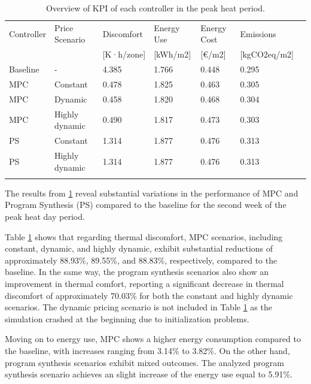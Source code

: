 \begin{table}
    \caption{Overview of KPI of each controller in the peak heat period.}
    \label{tab:2}
    
    \centering
    \begin{tabular}{lllllll}
        \hline
        \noalign{\smallskip}
        Controller & Price Scenario & Discomfort & Energy Use & Energy Cost & Emissions  \\
        & & [K·h/zone] & [kWh/m2] & [€/m2] & [kgCO2eq/m2] \\
        \noalign{\smallskip}
        \hline
        \noalign{\smallskip}
        Baseline & - & 4.385 & 1.766 & 0.448 & 0.295 \\
        MPC & Constant & 0.478 & 1.825 & 0.463 & 0.305 \\
        MPC & Dynamic & 0.458 & 1.820 & 0.468 & 0.304 \\
        MPC & Highly dynamic & 0.490 & 1.817 & 0.473 & 0.303 \\
        PS & Constant & 1.314 & 1.877 & 0.476 & 0.313 \\
        PS & Highly dynamic & 1.314 & 1.877 & 0.476 & 0.313 \\
        \noalign{\smallskip}
        \hline
    \end{tabular}
\end{table}

 The results from \ref{tab:2} reveal substantial variations in the performance of MPC and Program Synthesis (PS) compared to the baseline for the second week of the peak heat day period.

Table \ref{tab:2} shows that regarding thermal discomfort, MPC scenarios, including constant, dynamic, and highly dynamic, exhibit substantial reductions of approximately 88.93\%, 89.55\%, and 88.83\%, respectively, compared to the baseline. In the same way, the program synthesis scenarios also show an improvement in thermal comfort, reporting a significant decrease in thermal discomfort of approximately 70.03\% for both the constant and highly dynamic scenarios. The dynamic pricing scenario is not included in Table \ref{tab:2} as the simulation crashed at the beginning due to initialization problems.

Moving on to energy use, MPC shows a higher energy consumption compared to the baseline, with increases ranging from 3.14\% to 3.82\%. On the other hand, program synthesis scenarios exhibit mixed outcomes. The analyzed program synthesis scenario achieves an slight increase of the energy use equal to 5.91\%.

